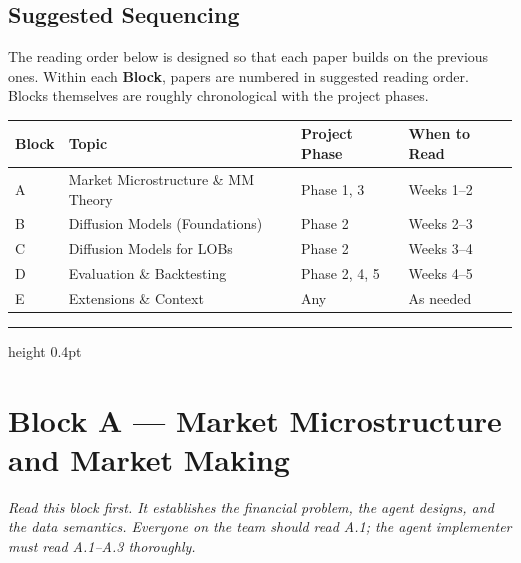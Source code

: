 \documentclass[11pt,a4paper]{article}
\begin{document}
\subsection*{Suggested Sequencing}

The reading order below is designed so that each paper builds on the previous ones.  Within each \textbf{Block}, papers are numbered in suggested reading order.  Blocks themselves are roughly chronological with the project phases.

\begin{center}
\small
\begin{tabular}{llll}
\toprule
\textbf{Block} & \textbf{Topic} & \textbf{Project Phase} & \textbf{When to Read} \\
\midrule
A & Market Microstructure \& MM Theory & Phase 1, 3 & Weeks 1--2 \\
B & Diffusion Models (Foundations) & Phase 2 & Weeks 2--3 \\
C & Diffusion Models for LOBs & Phase 2 & Weeks 3--4 \\
D & Evaluation \& Backtesting & Phase 2, 4, 5 & Weeks 4--5 \\
E & Extensions \& Context & Any & As needed \\
\bottomrule
\end{tabular}
\end{center}

\vspace{0.3cm}
\hrule height 0.4pt
\newpage

\section{Block A --- Market Microstructure and Market Making}

\textit{Read this block first.  It establishes the financial problem, the agent designs, and the data semantics.  Everyone on the team should read A.1; the agent implementer must read A.1--A.3 thoroughly.}

\bigskip
\end{document}

